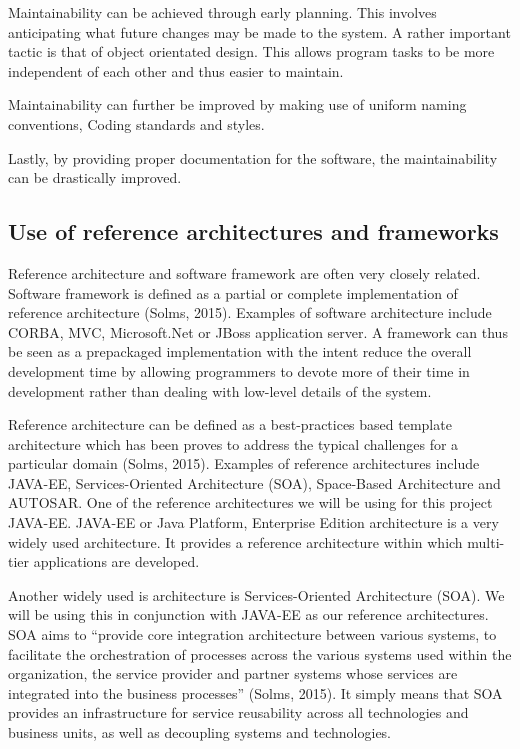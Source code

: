 \documentclass[a4paper,12pt]{article}
\begin{document}
\begin{flushleft}
	Maintainability can be achieved through early planning. This involves anticipating what future changes may be made to the system. A rather important tactic is that of object orientated design. This allows program tasks to be more independent of each other and thus easier to maintain.
	
	Maintainability can further be improved by making use of uniform naming conventions, Coding standards and styles. 
	
	Lastly, by providing proper documentation for the software, the maintainability can be drastically improved. 	
	
\end{flushleft}
\newpage
\subsection{Use of reference architectures and frameworks}
Reference architecture and software framework are often very closely related. Software framework is defined as a partial or complete implementation of reference architecture (Solms, 2015). Examples of software architecture include CORBA, MVC, Microsoft.Net or JBoss application server. A framework can thus be seen as a prepackaged implementation with the intent reduce the overall development time by allowing programmers to devote more of their time in development rather than dealing with low-level  details of the system.

Reference architecture can be defined as a best-practices based template architecture which has been proves to address the typical challenges for a particular domain (Solms, 2015). Examples of reference architectures include JAVA-EE, Services-Oriented Architecture (SOA), Space-Based Architecture and AUTOSAR. One of the reference architectures we will be using for this project JAVA-EE. JAVA-EE or Java Platform, Enterprise Edition architecture is a very widely used architecture. It provides a reference architecture within which multi-tier applications are developed. 

Another widely used is architecture is Services-Oriented Architecture (SOA). We will be using this in conjunction with JAVA-EE as our reference architectures. SOA aims to “provide core integration architecture between various systems, to facilitate the orchestration of processes across the various systems used within the organization, the service provider and partner systems whose services are integrated into the business processes” (Solms, 2015). It simply means that SOA provides an infrastructure for service reusability across all technologies and business units, as well as decoupling systems and technologies.
\end{document}
